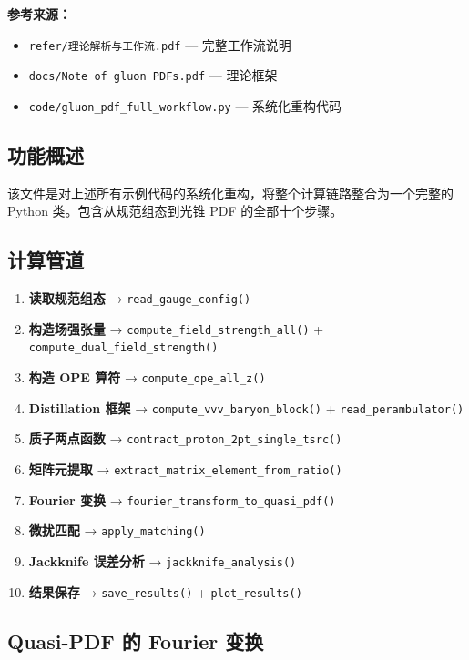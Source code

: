 \documentclass[12pt,a4paper]{ctexart}
\begin{document}
\textbf{参考来源：}
\begin{itemize}
    \item \texttt{refer/理论解析与工作流.pdf} — 完整工作流说明
    \item \texttt{docs/Note of gluon PDFs.pdf} — 理论框架
    \item \texttt{code/gluon\_pdf\_full\_workflow.py} — 系统化重构代码
\end{itemize}

\subsection{功能概述}

该文件是对上述所有示例代码的系统化重构，将整个计算链路整合为一个完整的 Python 类。包含从规范组态到光锥 PDF 的全部十个步骤。

\subsection{计算管道}

\begin{enumerate}
    \item \textbf{读取规范组态} → \texttt{read\_gauge\_config()}
    \item \textbf{构造场强张量} → \texttt{compute\_field\_strength\_all()} + \texttt{compute\_dual\_field\_strength()}
    \item \textbf{构造 OPE 算符} → \texttt{compute\_ope\_all\_z()}
    \item \textbf{Distillation 框架} → \texttt{compute\_vvv\_baryon\_block()} + \texttt{read\_perambulator()}
    \item \textbf{质子两点函数} → \texttt{contract\_proton\_2pt\_single\_tsrc()}
    \item \textbf{矩阵元提取} → \texttt{extract\_matrix\_element\_from\_ratio()}
    \item \textbf{Fourier 变换} → \texttt{fourier\_transform\_to\_quasi\_pdf()}
    \item \textbf{微扰匹配} → \texttt{apply\_matching()}
    \item \textbf{Jackknife 误差分析} → \texttt{jackknife\_analysis()}
    \item \textbf{结果保存} → \texttt{save\_results()} + \texttt{plot\_results()}
\end{enumerate}

\subsection{Quasi-PDF 的 Fourier 变换}
\end{document}
